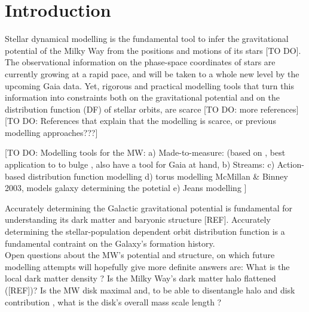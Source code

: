 \section{Introduction} \label{sec:intro}

Stellar dynamical modelling is the fundamental tool to infer the gravitational potential of the Milky Way from the positions and motions of its stars \citep{rix13,bin11b} [TO DO]. The observational information on the phase-space coordinates of stars are currently growing at a rapid pace, and will be taken to a whole new level by the upcoming Gaia data. Yet, rigorous and practical modelling tools that turn this information into constraints both on the gravitational potential and on the distribution function (DF) of stellar orbits, are scarce \citep{rix13} [TO DO: more references] [TO DO: References that explain that the modelling is scarce, or previous modelling approaches???]

[TO DO: Modelling tools for the MW: 
a) Made-to-measure: 
\citet{lor07}(based on \citet{sye96} , best application to to bulge \citet{bis04}, 
\citet{hun14} also have a tool for Gaia at hand, 
b) Streams: 
\citet{joh99} 
c) Action-based distribution function modelling
\citet{san15}
\citet{pif14}
d) torus modelling
McMillan \& Binney 2003, models galaxy determining the potetial
e) Jeans modelling
\citet{bue15}
\citet{loe12}]




Accurately determining the Galactic gravitational potential is fundamental for understanding its dark matter and baryonic structure [REF]. Accurately determining the stellar-population dependent orbit distribution function is a fundamental contraint on the Galaxy's formation history. \\

Open questions about the MW's potential and structure, on which future modelling attempts will hopefully give more definite answers are: What is the local dark matter density \citep{zha13,bt12}? Is the Milky Way's dark matter halo flattened ([REF])? Is the MW disk maximal \citep{sac97} and, to be able to disentangle halo and disk contribution \citep{deh98}, what is the disk's overall mass scale length \citep{bov13}?  \\


